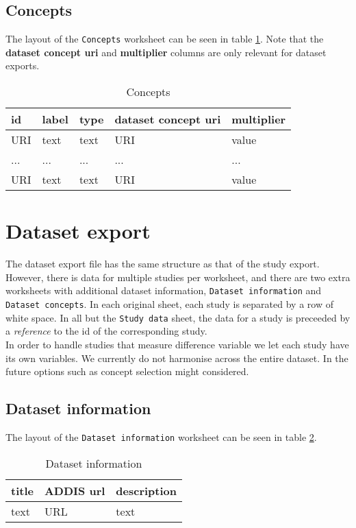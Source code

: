 \documentclass[a4paper,10pt]{article}
\begin{document}
\subsection{Concepts}
The layout of the \texttt{Concepts} worksheet can be seen in table \ref{table:Concepts}. Note that the \textbf{dataset concept uri} and \textbf{multiplier} columns are only relevant for dataset exports.
\begin{table}[!h]
  \centering
  \caption{Concepts}
  \label{table:Concepts}
  \begin{tabular}{|l|l|l|l|l|}
    \hline
    \textbf{id} & \textbf{label} & \textbf{type} & \textbf{dataset concept uri} & \textbf{multiplier} \\ \hline
    URI         & text           & text          & URI                          & value               \\ \hline
    ...         & ...            & ...           & ...                          & ...                 \\ \hline
    URI         & text           & text          & URI                          & value               \\ \hline
  \end{tabular}
\end{table}

\section{Dataset export}
The dataset export file has the same structure as that of the study export. However, there is data for multiple studies per worksheet, and there are two extra worksheets with additional dataset information, \texttt{Dataset information} and \texttt{Dataset concepts}. In each original sheet, each study is separated by a row of white space. In all but the \texttt{Study data} sheet, the data for a study is preceeded by a \textit{reference} to the id of the corresponding study.\\
In order to handle studies that measure difference variable we let each study have its own variables. We currently do not harmonise across the entire dataset. In the future options such as concept selection might considered.

\subsection{Dataset information}
The layout of the \texttt{Dataset information} worksheet can be seen in table \ref{table:Dataset information}.
\begin{table}[!h]
  \centering
  \caption{Dataset information}
  \label{table:Dataset information}
  \begin{tabular}{|l|l|l|}
    \hline
    \textbf{title} & \textbf{ADDIS url} & \textbf{description} \\ \hline
    text           & URL                & text                 \\ \hline
  \end{tabular}
\end{table}
\end{document}

